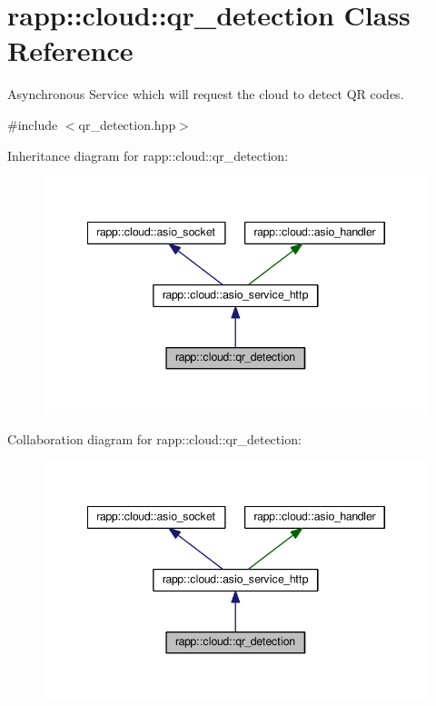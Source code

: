 \hypertarget{classrapp_1_1cloud_1_1qr__detection}{\section{rapp\-:\-:cloud\-:\-:qr\-\_\-detection Class Reference}
\label{classrapp_1_1cloud_1_1qr__detection}
}


Asynchronous Service which will request the cloud to detect Q\-R codes.  




{\ttfamily \#include $<$qr\-\_\-detection.\-hpp$>$}



Inheritance diagram for rapp\-:\-:cloud\-:\-:qr\-\_\-detection\-:
\nopagebreak
\begin{figure}[H]
\begin{center}
\leavevmode
\includegraphics[width=345pt]{classrapp_1_1cloud_1_1qr__detection__inherit__graph}
\end{center}
\end{figure}


Collaboration diagram for rapp\-:\-:cloud\-:\-:qr\-\_\-detection\-:
\nopagebreak
\begin{figure}[H]
\begin{center}
\leavevmode
\includegraphics[width=345pt]{classrapp_1_1cloud_1_1qr__detection__coll__graph}
\end{center}
\end{figure}
